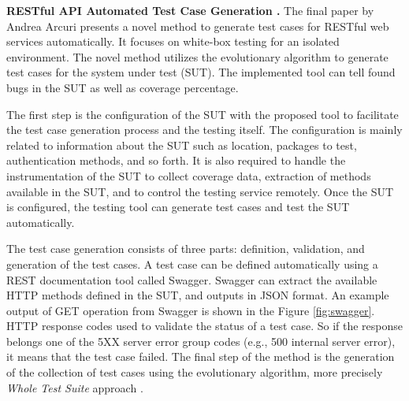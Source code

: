 \documentclass[english]{tktltiki}
\begin{document}
\textbf{RESTful API Automated Test Case Generation \cite{arcuri2017restful}.} The final paper by Andrea Arcuri \cite{arcuri2017restful} presents a novel method to generate test cases for RESTful web services automatically. It focuses on white-box testing for an isolated environment. The novel method utilizes the evolutionary algorithm to generate test cases for the system under test (SUT). The implemented tool can tell found bugs in the SUT as well as coverage percentage.

The first step is the configuration of the SUT with the proposed tool to facilitate the test case generation process and the testing itself. The configuration is mainly related to information about the SUT such as location, packages to test, authentication methods, and so forth. It is also required to handle the instrumentation of the SUT to collect coverage data, extraction of methods available in the SUT, and to control the testing service remotely. Once the SUT is configured, the testing tool can generate test cases and test the SUT automatically.

The test case generation consists of three parts: definition, validation, and generation of the test cases. A test case can be defined automatically using a REST documentation tool called Swagger. Swagger can extract the available HTTP methods defined in the SUT, and outputs in JSON format. An example output of GET operation from Swagger is shown in the Figure \ref{fig:swagger}. HTTP response codes used to validate the status of a test case. So if the response belongs one of the 5XX server error group codes (e.g., 500 internal server error), it means that the test case failed. The final step of the method is the generation of the collection of test cases using the evolutionary algorithm, more precisely \textit{Whole Test Suite} approach \cite{fraser2013whole}.
\end{document}
